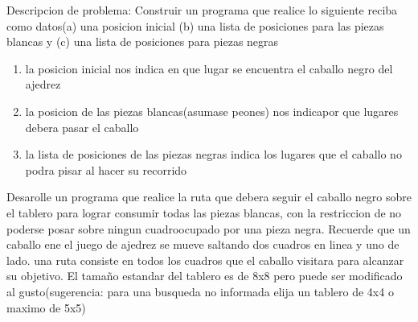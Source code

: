 \documentclass{article}
\begin{document}
    \begin{section}{Descripcion de problema:}
    Construir un programa que realice lo siguiente
     reciba como datos(a) una posicion inicial (b) una lista de posiciones para
      las piezas blancas y (c) una lista de posiciones para piezas negras
    \begin{enumerate}
        \item la posicion inicial nos indica en que lugar se encuentra el
        caballo negro del ajedrez
        \item la posicion de las piezas blancas(asumase peones) nos
        indicapor que lugares debera pasar el caballo
        \item la lista de posiciones de las piezas negras indica los lugares
        que el caballo no podra pisar al hacer su recorrido
    \end{enumerate}
     Desarolle un programa que realice la ruta que debera seguir el caballo
     negro sobre el tablero para lograr consumir todas las piezas blancas,
     con la restriccion de no poderse posar sobre ningun cuadroocupado por
     una pieza negra. Recuerde  que un caballo ene el juego de ajedrez se
     mueve saltando dos cuadros en linea y uno de lado.
     una ruta consiste en todos los cuadros que el caballo visitara para
     alcanzar su objetivo. El tamaño estandar del tablero es de 8x8 pero
     puede ser modificado al gusto(sugerencia: para una busqueda no
     informada elija un tablero de 4x4 o maximo de 5x5)
    \end{section}
\end{document}
